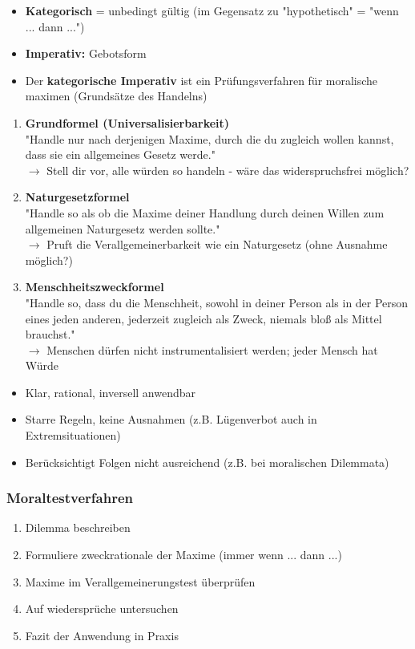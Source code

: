 \begin{itemize}
    \item \textbf{Kategorisch} = unbedingt gültig (im Gegensatz zu "hypothetisch" = "wenn ... dann ...")
    \item \textbf{Imperativ:} Gebotsform
    \item Der \textbf{kategorische Imperativ} ist ein Prüfungsverfahren für moralische maximen (Grundsätze des Handelns)
\end{itemize}

\begin{enumerate}
    \item \textbf{Grundformel (Universalisierbarkeit)} \\
    "Handle nur nach derjenigen Maxime, durch die du zugleich wollen kannst, dass sie ein allgemeines Gesetz werde." \\
    $\rightarrow$ Stell dir vor, alle würden so handeln - wäre das widerspruchsfrei möglich?
    \item \textbf{Naturgesetzformel} \\
    "Handle so als ob die Maxime deiner Handlung durch deinen Willen zum allgemeinen Naturgesetz werden sollte." \\
    $\rightarrow$ Pruft die Verallgemeinerbarkeit wie ein Naturgesetz (ohne Ausnahme möglich?)
    \item \textbf{Menschheitszweckformel} \\
    "Handle so, dass du die Menschheit, sowohl in deiner Person als in der Person eines jeden anderen, jederzeit zugleich als Zweck, niemals bloß als Mittel brauchst." \\
    $\rightarrow$ Menschen dürfen nicht instrumentalisiert werden; jeder Mensch hat Würde
\end{enumerate}

\begin{itemize}
    \item Klar, rational, inversell anwendbar
    \item Starre Regeln, keine Ausnahmen (z.B. Lügenverbot auch in Extremsituationen)
    \item Berücksichtigt Folgen nicht ausreichend (z.B. bei moralischen Dilemmata)
\end{itemize}

\subsubsection{Moraltestverfahren}
\begin{enumerate}
    \item Dilemma beschreiben
    \item Formuliere zweckrationale der Maxime (immer wenn ... dann ...)
    \item Maxime im Verallgemeinerungstest überprüfen
    \item Auf wiedersprüche untersuchen
    \item Fazit der Anwendung in Praxis
\end{enumerate}


